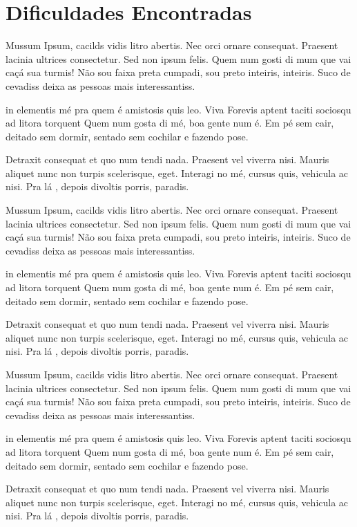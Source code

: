 \section{Dificuldades Encontradas}

Mussum Ipsum, cacilds vidis litro abertis. Nec orci ornare consequat. Praesent lacinia ultrices consectetur. Sed non ipsum felis. Quem num gosti di mum que vai caçá sua turmis! Não sou faixa preta cumpadi, sou preto inteiris, inteiris. Suco de cevadiss deixa as pessoas mais interessantiss.

in elementis mé pra quem é amistosis quis leo. Viva Forevis aptent taciti sociosqu ad litora torquent Quem num gosta di mé, boa gente num é. Em pé sem cair, deitado sem dormir, sentado sem cochilar e fazendo pose.

Detraxit consequat et quo num tendi nada. Praesent vel viverra nisi. Mauris aliquet nunc non turpis scelerisque, eget. Interagi no mé, cursus quis, vehicula ac nisi. Pra lá , depois divoltis porris, paradis.

Mussum Ipsum, cacilds vidis litro abertis. Nec orci ornare consequat. Praesent lacinia ultrices consectetur. Sed non ipsum felis. Quem num gosti di mum que vai caçá sua turmis! Não sou faixa preta cumpadi, sou preto inteiris, inteiris. Suco de cevadiss deixa as pessoas mais interessantiss.

in elementis mé pra quem é amistosis quis leo. Viva Forevis aptent taciti sociosqu ad litora torquent Quem num gosta di mé, boa gente num é. Em pé sem cair, deitado sem dormir, sentado sem cochilar e fazendo pose.

Detraxit consequat et quo num tendi nada. Praesent vel viverra nisi. Mauris aliquet nunc non turpis scelerisque, eget. Interagi no mé, cursus quis, vehicula ac nisi. Pra lá , depois divoltis porris, paradis.

Mussum Ipsum, cacilds vidis litro abertis. Nec orci ornare consequat. Praesent lacinia ultrices consectetur. Sed non ipsum felis. Quem num gosti di mum que vai caçá sua turmis! Não sou faixa preta cumpadi, sou preto inteiris, inteiris. Suco de cevadiss deixa as pessoas mais interessantiss.

in elementis mé pra quem é amistosis quis leo. Viva Forevis aptent taciti sociosqu ad litora torquent Quem num gosta di mé, boa gente num é. Em pé sem cair, deitado sem dormir, sentado sem cochilar e fazendo pose.

Detraxit consequat et quo num tendi nada. Praesent vel viverra nisi. Mauris aliquet nunc non turpis scelerisque, eget. Interagi no mé, cursus quis, vehicula ac nisi. Pra lá , depois divoltis porris, paradis.